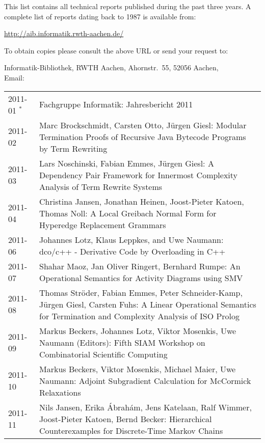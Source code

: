 \documentclass[color]{aib}
\begin{document}
{\bbb This list contains all technical reports published
  during the past three years.
  A complete list of reports dating back to 1987 is available from:
\begin{center}
  \url{http://aib.informatik.rwth-aachen.de/}
\end{center}
  To obtain copies please consult the above URL or send your request
  to:
\begin{center}
  Informatik-Bibliothek, RWTH Aachen, Ahornstr.~55, 52056 Aachen,\\
  Email: 
\end{center}}\bigskip


\begin{longtable}{lp{11cm}}


2011-01 $^\ast$ &Fachgruppe Informatik:      Jahresbericht 2011\\
2011-02 & Marc Brockschmidt, Carsten Otto, J\"{u}rgen Giesl:         Modular Termination Proofs of Recursive Java Bytecode Programs by Term Rewriting\\
2011-03 & Lars Noschinski, Fabian Emmes, J\"{u}rgen Giesl:         A Dependency Pair Framework for Innermost Complexity Analysis of Term Rewrite Systems\\
2011-04 & Christina Jansen, Jonathan Heinen, Joost-Pieter Katoen, Thomas Noll:         A Local Greibach Normal Form for Hyperedge Replacement Grammars\\
2011-06 & Johannes Lotz, Klaus Leppkes, and Uwe Naumann:         dco/c++ - Derivative Code by Overloading in C++\\
2011-07 & Shahar Maoz, Jan Oliver Ringert, Bernhard Rumpe:         An Operational Semantics for Activity Diagrams using SMV\\
2011-08 & Thomas Str\"{o}der, Fabian Emmes, Peter Schneider-Kamp, J\"{u}rgen Giesl, Carsten Fuhs:         A Linear Operational Semantics for Termination and Complexity Analysis of ISO Prolog\\
2011-09 & Markus Beckers, Johannes Lotz, Viktor Mosenkis, Uwe Naumann (Editors):         Fifth SIAM Workshop on Combinatorial Scientific Computing\\
2011-10 & Markus Beckers, Viktor Mosenkis, Michael Maier, Uwe Naumann:         Adjoint Subgradient Calculation for McCormick Relaxations\\
2011-11 & Nils Jansen, Erika \'{A}brah\'{a}m, Jens Katelaan, Ralf Wimmer, Joost-Pieter Katoen, Bernd Becker:         Hierarchical Counterexamples for Discrete-Time Markov Chains\\

\end{longtable}
\end{document}
